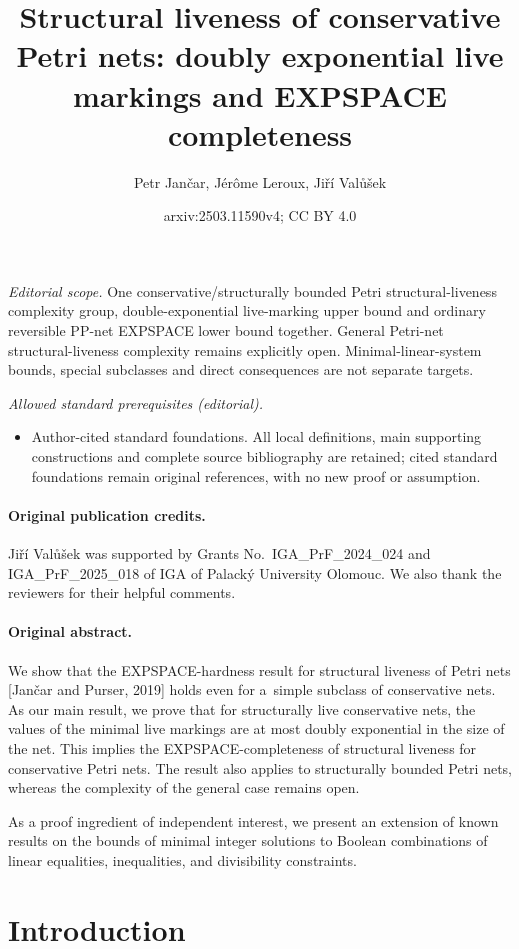 \documentclass[11pt,a4paper]{amsart}
\title{Structural liveness of conservative Petri nets: doubly exponential live markings and EXPSPACE completeness}
\author{Petr Jančar, Jérôme Leroux, Jiří Valůšek}
\date{arxiv:2503.11590v4; CC BY 4.0}
\theoremstyle{plain}
\theoremstyle{definition}
\theoremstyle{defC}
\theoremstyle{thmC}
\begin{document}
\maketitle
\noindent\textit{Editorial scope.} One conservative/structurally bounded Petri structural-liveness complexity group, double-exponential live-marking upper bound and ordinary reversible PP-net EXPSPACE lower bound together. General Petri-net structural-liveness complexity remains explicitly open. Minimal-linear-system bounds, special subclasses and direct consequences are not separate targets.\par\medskip
\noindent\textit{Allowed standard prerequisites (editorial).}\begin{itemize}
\item Author-cited standard foundations. All local definitions, main supporting constructions and complete source bibliography are retained; cited standard foundations remain original references, with no new proof or assumption.
\end{itemize}\medskip
\paragraph{Original publication credits.} Ji\v{r}\'{i} Val\r{u}\v{s}ek was supported by
Grants No.\ IGA\_PrF\_2024\_024 and IGA\_PrF\_2025\_018 of IGA of Palack\'y University Olomouc.
We also thank the reviewers for their helpful comments.
\paragraph{Original abstract.} 
  \noindent We show that the EXPSPACE-hardness result for
	structural liveness of Petri nets [Jan\v{c}ar and
	Purser, 2019] holds even for a~simple subclass of
	conservative nets. As our main result, we prove that
	for structurally live conservative nets, the values of the
	minimal live markings are at most doubly exponential in the
	size of the net. This implies the EXPSPACE-completeness
	of structural liveness for conservative Petri nets. 
	The result also applies to structurally bounded Petri nets,
	whereas
the complexity of the general case remains open. 

As a proof ingredient of independent interest, we present an extension of known results on the bounds of minimal integer solutions to Boolean combinations of linear equalities, inequalities, and divisibility constraints.


\section{Introduction}
\end{document}
